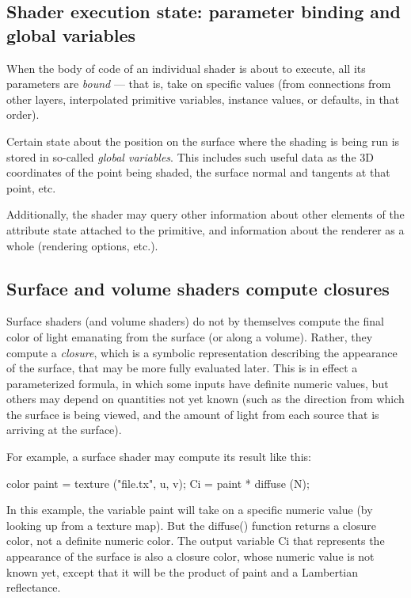 \documentclass[11pt,letterpaper]{book}
\def\color{{\cf color}\xspace}
\def\colorclosure{{\cf closure color}\xspace}
\begin{document}
\subsection*{Shader execution state: parameter binding and global variables}

When the body of code of an individual shader is about to execute, all
its parameters are \emph{bound} --- that is, take on specific values
(from connections from other layers, interpolated primitive variables,
instance values, or defaults, in that order).

Certain state about the position on the surface where the shading is
being run is stored in so-called \emph{global variables}.  This includes
such useful data as the 3D coordinates of the point being shaded, the
surface normal and tangents at that point, etc.

Additionally, the shader may query other information about other
elements of the attribute state attached to the primitive, and
information about the renderer as a whole (rendering options, etc.).

\subsection*{Surface and volume shaders compute closures}

Surface shaders (and volume shaders) do not by themselves compute the
final color of light emanating from the surface (or along a volume).
Rather, they compute a \emph{closure}, which is a symbolic representation
describing the appearance of the surface, that may be more fully
evaluated later.  This is in effect a parameterized formula, in which
some inputs have definite numeric values, but others may depend on
quantities not yet known (such as the direction from which the surface
is being viewed, and the amount of light from each source that is
arriving at the surface).

For example, a surface shader may compute its result like this:

\begin{code}
    color paint = texture ("file.tx", u, v);
    Ci = paint * diffuse (N);
\end{code}

\noindent In this example, the variable {\cf paint} will take on a
specific numeric value (by looking up from a texture map).  But the {\cf
  diffuse()} function returns a \colorclosure, not a definite numeric
\color.  The output variable {\cf Ci} that represents the appearance of
the surface is also a \colorclosure, whose numeric value is not known
yet, except that it will be the product of {\cf paint} and a Lambertian
reflectance.
\end{document}
